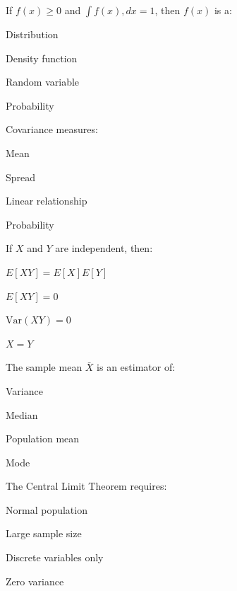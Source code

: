\documentclass{CWNUExam}
\begin{document}
\begin{question}
If $f(x)\ge0$ and $\int f(x),dx=1$, then $f(x)$ is a:
\paren
\begin{choices}
\item Distribution
\item Density function
\item Random variable
\item Probability
\end{choices}
\end{question}

\begin{question}
Covariance measures:
\paren
\begin{choices}
\item Mean
\item Spread
\item Linear relationship
\item Probability
\end{choices}
\end{question}

\begin{question}
If $X$ and $Y$ are independent, then:
\paren
\begin{choices}
\item $E[XY]=E[X]E[Y]$
\item $E[XY]=0$
\item $\mathrm{Var}(XY)=0$
\item $X=Y$
\end{choices}
\end{question}

\begin{question}
The sample mean $\bar X$ is an estimator of:
\paren
\begin{choices}
\item Variance
\item Median
\item Population mean
\item Mode
\end{choices}
\end{question}

\begin{question}
The Central Limit Theorem requires:
\paren
\begin{choices}
\item Normal population
\item Large sample size
\item Discrete variables only
\item Zero variance
\end{choices}
\end{question}
\end{document}
